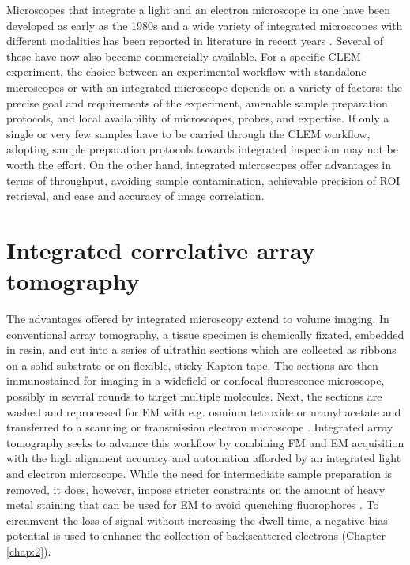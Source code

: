 Microscopes that integrate a light and an electron microscope in one have been developed as early as the 1980s and a wide variety of integrated microscopes with different modalities has been reported in literature in recent years \cite{zonnevylle2013integration, timmermans2015contributed}. Several of these have now also become commercially available. For a specific CLEM experiment, the choice between an experimental workflow with standalone microscopes or with an integrated microscope depends on a variety of factors: the precise goal and requirements of the experiment, amenable sample preparation protocols, and local availability of microscopes, probes, and expertise. If only a single or very few samples have to be carried through the CLEM workflow, adopting sample preparation protocols towards integrated inspection may not be worth the effort. On the other hand, integrated microscopes offer advantages in terms of throughput, avoiding sample contamination, achievable precision of ROI retrieval, and ease and accuracy of image correlation.


\section{Integrated correlative array tomography}
\label{sec:1_iCAT}

The advantages offered by integrated microscopy extend to volume imaging. In conventional array tomography, a tissue specimen is chemically fixated, embedded in resin, and cut into a series of ultrathin sections which are collected as ribbons on a solid substrate or on flexible, sticky Kapton tape. The sections are then immunostained for imaging in a widefield or confocal fluorescence microscope, possibly in several rounds to target multiple molecules. Next, the sections are washed and reprocessed for EM with e.g. osmium tetroxide or uranyl acetate and transferred to a scanning or transmission electron microscope \cite{micheva2007array, wacker2013array}. Integrated array tomography seeks to advance this workflow by combining FM and EM acquisition with the high alignment accuracy and automation afforded by an integrated light and electron microscope. While the need for intermediate sample preparation is removed, it does, however, impose stricter constraints on the amount of heavy metal staining that can be used for EM to avoid quenching fluorophores \cite{kuipers2015scanning, peddie2017correlative}. To circumvent the loss of signal without increasing the dwell time, a negative bias potential is used to enhance the collection of backscattered electrons (Chapter \ref{chap:2}).


